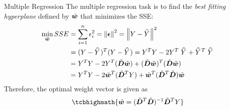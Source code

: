 %
\begin{frame}{Multiple Regression}
The multiple regression task is to find the {\em best fitting hyperplane} defined
by  $\abw$ that minimizes the SSE:
\begin{align*}
    \min_{\abw} SSE & = \sum_{i=1}^{n} \epsilon_i^2 =
    \norm{\bepsilon}^2 = \norm{Y - \hY}^2 \notag\\
    & = (Y -\hY)^T (Y - \hY) = Y^T Y - 2 Y^T\; \hY +
    \hY^T\; \hY\notag\\
    & = Y^T Y -2 Y^T (\abD \abw) + (\abD \abw)^T (\abD \abw)\notag\\
    & = Y^T Y - 2 \abw^T (\abD^T Y) + \abw^T (\abD^T \abD) \abw
\end{align*}
%
Therefore, the optimal weight vector is given as
\begin{align*}
    \tcbhighmath{
    \abw = (\abD^T \abD)^{-1} \abD^T Y}
\end{align*}
\end{frame}
%
